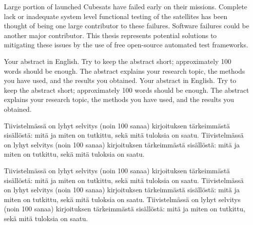 \documentclass[english,12pt,a4paper,pdftex,elec,utf8]{aaltothesis}
\begin{document}
\makecoverpage



\begin{abstractpage}[english]
 Large portion of launched Cubesats have failed early on their missions. Complete lack or inadequate system level functional testing of the satellites has been thought of being one large contributor to these failures. Software failures could be another major contributor. This thesis represents potential solutions to mitigating these issues by the use of free open-source automated test frameworks.

  Your abstract in English. Try to keep the abstract short; approximately 
  100 words should be enough. The abstract explains your research topic, 
  the methods you have used, and the results you obtained.  
  Your abstract in English. Try to keep the abstract short; approximately 
  100 words should be enough. The abstract explains your research topic, 
  the methods you have used, and the results you obtained.  
\end{abstractpage}

\newpage
%
\begin{abstractpage}[finnish]
  Tiivistelmässä on lyhyt selvitys (noin 100 sanaa)
  kirjoituksen tärkeimmästä sisällöstä: mitä ja miten on tutkittu,
  sekä mitä tuloksia on saatu. 
  Tiivistelmässä on lyhyt selvitys (noin 100 sanaa)
  kirjoituksen tärkeimmästä sisällöstä: mitä ja miten on tutkittu,
  sekä mitä tuloksia on saatu. 

  Tiivistelmässä on lyhyt selvitys (noin 100 sanaa)
  kirjoituksen tärkeimmästä sisällöstä: mitä ja miten on tutkittu,
  sekä mitä tuloksia on saatu. 
  Tiivistelmässä on lyhyt selvitys (noin 100 sanaa)
  kirjoituksen tärkeimmästä sisällöstä: mitä ja miten on tutkittu,
  sekä mitä tuloksia on saatu. 
  Tiivistelmässä on lyhyt selvitys (noin 100 sanaa)
  kirjoituksen tärkeimmästä sisällöstä: mitä ja miten on tutkittu,
  sekä mitä tuloksia on saatu. 
\end{abstractpage}
\end{document}
